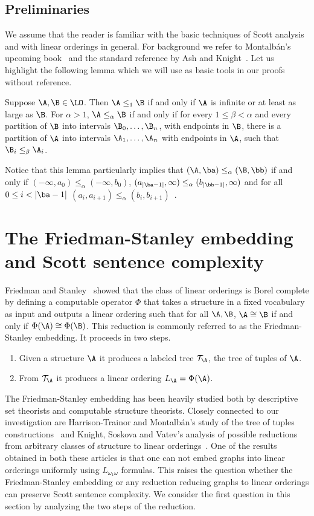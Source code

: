 \documentclass{amsart}
\newcommand{\T}{{\mathcal{T}}}
\begin{document}
\subsection{Preliminaries}
We assume that the reader is familiar with the basic techniques of Scott
analysis and with linear orderings in general. For background we refer to
Montalb\'an's upcoming book~\cite{montalban2021} and the standard reference by
Ash and Knight~\cite{ash2000}. Let us highlight the following lemma
which we will use as basic tools in our proofs without reference.
\begin{lemma}\label{lem:bfandpartitions}  Suppose $\A,\B\in\LO$. Then $\A\leq_1 \B$ if and only if $\A$ is infinite or at least as large as $\B$. For $\alpha>1$, $\A\leq_\alpha \B$ if and only if for every $1\leq\beta<\alpha$ and every partition of $\B$ into intervals $\B_0,\dots,\B_n$, with endpoints in $\B$, there is a partition of $\A$ into intervals $\A_1,\dots,\A_n$ with endpoints in $\A$, such that $\B_i\leq_\beta \A_i$.
\end{lemma}
Notice that this lemma particularly implies that $(\A,\ba)\leq_\alpha (\B,\bb)$
if and only if $(-\infty, a_0)\leq_\alpha (-\infty, b_0)$,
$(a_{|\ba-1|},\infty)\leq_\alpha (b_{|\bb-1|},\infty)$ and for all $0\leq
i<|\ba-1|$ $(a_i,a_{i+1})\leq_\alpha (b_i,b_{i+1})$~\cite[Lemma 15.7]{ash2000}.

 \section{The Friedman-Stanley embedding and Scott sentence complexity}\label{sec:fs-ssc}
Friedman and Stanley~\cite{friedman1989} showed that the class of linear orderings is Borel complete
by defining a computable operator $\Phi$ that takes a structure in a fixed
vocabulary as input and outputs a linear ordering such that for all $\A,\B$,
$\A\cong\B$ if and only if $\Phi(\A)\cong \Phi(\B)$. This reduction is commonly
referred to as the Friedman-Stanley embedding. It proceeds in two steps.
\begin{enumerate}
   \tightlist
   \item\label{item:tree-of-tuples} Given a structure $\A$ it produces a labeled
      tree $\T_\A$, the
      tree of tuples of $\A$.
   \item From $\T_\A$ it produces a linear ordering $L_\A=\Phi(\A)$.
\end{enumerate}
The Friedman-Stanley embedding has been heavily studied both by descriptive set
theorists and computable structure theorists. Closely connected to our
investigation are Harrison-Trainor and Montalbán's study of the tree of
tuples constructions~\cite{harrison-trainor2022a} and Knight, Soskova and
Vatev's analysis of possible reductions from arbitrary classes of structure to
linear orderings~\cite{knight2020}. One of the results obtained in both these
articles is that one can not embed graphs into linear orderings uniformly using
$L_{\omega_1\omega}$ formulas. This raises the question whether the Friedman-Stanley embedding or any
reduction reducing graphs to linear orderings can preserve Scott sentence
complexity. We consider the first question in this section by analyzing the two
steps of the reduction.
\end{document}
